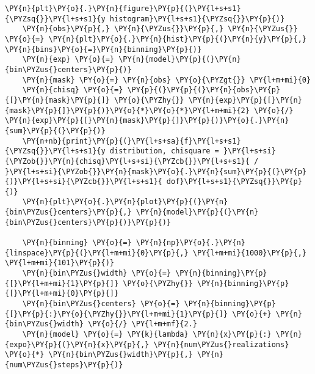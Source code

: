 \begin{Verbatim}[label=\makebox{\href{https://github.com/unipi-physics-labs/lab1-sheets/tree/main/snippy/random_walk.py}{https://github.com/.../random\_walk.py}},commandchars=\\\{\}]
    \PY{n}{plt}\PY{o}{.}\PY{n}{figure}\PY{p}{(}\PY{l+s+s1}{\PYZsq{}}\PY{l+s+s1}{y histogram}\PY{l+s+s1}{\PYZsq{}}\PY{p}{)}
    \PY{n}{obs}\PY{p}{,} \PY{n}{\PYZus{}}\PY{p}{,} \PY{n}{\PYZus{}} \PY{o}{=} \PY{n}{plt}\PY{o}{.}\PY{n}{hist}\PY{p}{(}\PY{n}{y}\PY{p}{,} \PY{n}{bins}\PY{o}{=}\PY{n}{binning}\PY{p}{)}
    \PY{n}{exp} \PY{o}{=} \PY{n}{model}\PY{p}{(}\PY{n}{bin\PYZus{}centers}\PY{p}{)}
    \PY{n}{mask} \PY{o}{=} \PY{n}{obs} \PY{o}{\PYZgt{}} \PY{l+m+mi}{0}
    \PY{n}{chisq} \PY{o}{=} \PY{p}{(}\PY{p}{(}\PY{n}{obs}\PY{p}{[}\PY{n}{mask}\PY{p}{]} \PY{o}{\PYZhy{}} \PY{n}{exp}\PY{p}{[}\PY{n}{mask}\PY{p}{]}\PY{p}{)}\PY{o}{*}\PY{o}{*}\PY{l+m+mi}{2} \PY{o}{/} \PY{n}{exp}\PY{p}{[}\PY{n}{mask}\PY{p}{]}\PY{p}{)}\PY{o}{.}\PY{n}{sum}\PY{p}{(}\PY{p}{)}
    \PY{n+nb}{print}\PY{p}{(}\PY{l+s+sa}{f}\PY{l+s+s1}{\PYZsq{}}\PY{l+s+s1}{y distribution, chisquare = }\PY{l+s+si}{\PYZob{}}\PY{n}{chisq}\PY{l+s+si}{\PYZcb{}}\PY{l+s+s1}{ / }\PY{l+s+si}{\PYZob{}}\PY{n}{mask}\PY{o}{.}\PY{n}{sum}\PY{p}{(}\PY{p}{)}\PY{l+s+si}{\PYZcb{}}\PY{l+s+s1}{ dof}\PY{l+s+s1}{\PYZsq{}}\PY{p}{)}
    \PY{n}{plt}\PY{o}{.}\PY{n}{plot}\PY{p}{(}\PY{n}{bin\PYZus{}centers}\PY{p}{,} \PY{n}{model}\PY{p}{(}\PY{n}{bin\PYZus{}centers}\PY{p}{)}\PY{p}{)}

    \PY{n}{binning} \PY{o}{=} \PY{n}{np}\PY{o}{.}\PY{n}{linspace}\PY{p}{(}\PY{l+m+mi}{0}\PY{p}{,} \PY{l+m+mi}{1000}\PY{p}{,} \PY{l+m+mi}{101}\PY{p}{)}
    \PY{n}{bin\PYZus{}width} \PY{o}{=} \PY{n}{binning}\PY{p}{[}\PY{l+m+mi}{1}\PY{p}{]} \PY{o}{\PYZhy{}} \PY{n}{binning}\PY{p}{[}\PY{l+m+mi}{0}\PY{p}{]}
    \PY{n}{bin\PYZus{}centers} \PY{o}{=} \PY{n}{binning}\PY{p}{[}\PY{p}{:}\PY{o}{\PYZhy{}}\PY{l+m+mi}{1}\PY{p}{]} \PY{o}{+} \PY{n}{bin\PYZus{}width} \PY{o}{/} \PY{l+m+mf}{2.}
    \PY{n}{model} \PY{o}{=} \PY{k}{lambda} \PY{n}{x}\PY{p}{:} \PY{n}{expo}\PY{p}{(}\PY{n}{x}\PY{p}{,} \PY{n}{num\PYZus{}realizations} \PY{o}{*} \PY{n}{bin\PYZus{}width}\PY{p}{,} \PY{n}{num\PYZus{}steps}\PY{p}{)}


\end{Verbatim}
